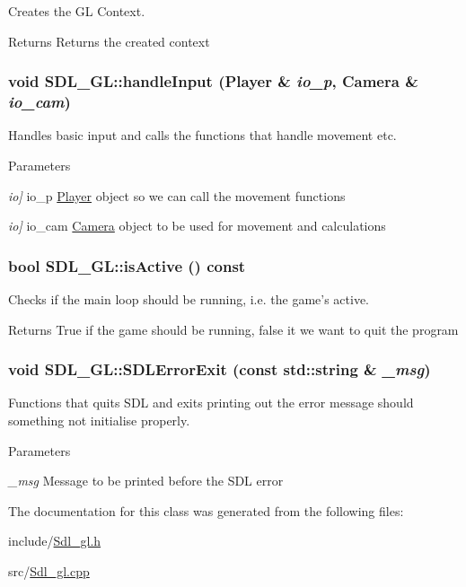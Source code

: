 Creates the GL Context. \begin{DoxyReturn}{Returns}
Returns the created context 
\end{DoxyReturn}
\hypertarget{classSDL__GL_a9194ac801dcae2d282b79d7f055f9ec3}{
\subsubsection[{handleInput}]{\setlength{\rightskip}{0pt plus 5cm}void SDL\_\-GL::handleInput ({\bf Player} \& {\em io\_\-p}, \/  {\bf Camera} \& {\em io\_\-cam})}}
\label{classSDL__GL_a9194ac801dcae2d282b79d7f055f9ec3}


Handles basic input and calls the functions that handle movement etc. 
\begin{DoxyParams}{Parameters}
\item[{\em io\mbox{]}}]io\_\-p \hyperlink{classPlayer}{Player} object so we can call the movement functions \item[{\em io\mbox{]}}]io\_\-cam \hyperlink{classCamera}{Camera} object to be used for movement and calculations \end{DoxyParams}
\hypertarget{classSDL__GL_adee0be8bbc1db6c59ade77c047099927}{
\subsubsection[{isActive}]{\setlength{\rightskip}{0pt plus 5cm}bool SDL\_\-GL::isActive () const}}
\label{classSDL__GL_adee0be8bbc1db6c59ade77c047099927}


Checks if the main loop should be running, i.e. the game's active. \begin{DoxyReturn}{Returns}
True if the game should be running, false it we want to quit the program 
\end{DoxyReturn}
\hypertarget{classSDL__GL_afdb2059a9a295151d7d4bcaea4ec3f49}{
\subsubsection[{SDLErrorExit}]{\setlength{\rightskip}{0pt plus 5cm}void SDL\_\-GL::SDLErrorExit (const std::string \& {\em \_\-msg})}}
\label{classSDL__GL_afdb2059a9a295151d7d4bcaea4ec3f49}


Functions that quits SDL and exits printing out the error message should something not initialise properly. 
\begin{DoxyParams}{Parameters}
\item[{\em \_\-msg}]Message to be printed before the SDL error \end{DoxyParams}


The documentation for this class was generated from the following files:\begin{DoxyCompactItemize}
\item 
include/\hyperlink{Sdl__gl_8h}{Sdl\_\-gl.h}\item 
src/\hyperlink{Sdl__gl_8cpp}{Sdl\_\-gl.cpp}\end{DoxyCompactItemize}

